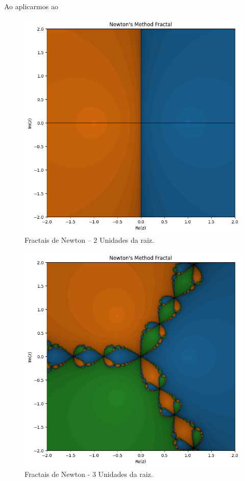 


Ao aplicarmos ao 

\begin{figure}[H]
    \centering 
    \includegraphics[width=1\textwidth]{Imagens/nr2d_fractals/unit_roots/unitroot2.png}
    \caption{Fractais de Newton -- 2 Unidades da raiz.}
    \label{fig:fractaisnr_unitroots2}
\end{figure}


\begin{figure}[H]
    \centering 
    \includegraphics[width=1\textwidth]{Imagens/nr2d_fractals/unit_roots/unitroot3.png}
    \caption{Fractais de Newton - 3 Unidades da raiz.}
    \label{fig:fractaisnr_unitroots3}
\end{figure}


